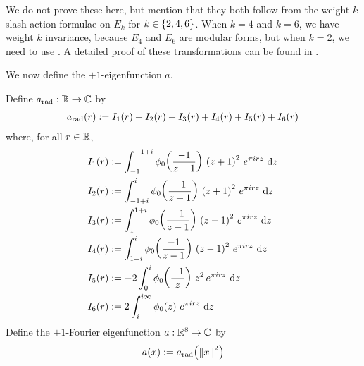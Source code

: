 We do not prove these here, but mention that they both follow from the weight $k$ slash action formulae on $E_k$ for $k \in \left\{ 2, 4, 6 \right\}$. When $k = 4$ and $k = 6$, we have weight $k$ invariance, because $E_4$ and $E_6$ are modular forms, but when $k = 2$, we need to use . A detailed proof of these transformations can be found in \cite{blueprint}.

We now define the $+1$-eigenfunction $a$.

\begin{boxdefinition}\label{Ch4:Def:a}
    Define $a_{\operatorname{rad}} : \mathbb{R} \to \mathbb{C}$ by
    \begin{align}
        a_{\operatorname{rad}}\!\left( r \right) := I_1(r) + I_2(r) + I_3(r) + I_4(r) + I_5(r) + I_6(r)
            \label{Ch4:Eq:a_rad_def}
    \end{align}
    where, for all $r \in \mathbb{R}$,
    \begin{align}
        I_1(r) &:= \int_{-1}^{-1 + i} \phi_0\of{\frac{-1}{z+1}} \,
                                 \parenth{z + 1}^2 \,
                                 e^{\pi i r z} \,
                                 \diff{z}
            \label{Ch4:Eq:I_1_def} \\
        I_2(r) &:= \int_{-1 + i}^{i} \phi_0\of{\frac{-1}{z+1}} \,
                                 \parenth{z + 1}^2 \,
                                 e^{\pi i r z} \,
                                 \diff{z}
            \label{Ch4:Eq:I_2_def} \\
        I_3(r) &:= \int_{1}^{1 + i} \phi_0\of{\frac{-1}{z - 1}} \,
                                \parenth{z - 1}^2 \,
                                e^{\pi i r z} \,
                                \diff{z}
            \label{Ch4:Eq:I_3_def} \\
        I_4(r) &:= \int_{1 + i}^{i} \phi_0\of{\frac{-1}{z - 1}} \,
                                \parenth{z - 1}^2 \,
                                e^{\pi i r z} \,
                                \diff{z}
            \label{Ch4:Eq:I_4_def} \\
        I_5(r) &:= -2 \int_{0}^{i} \phi_0\of{\frac{-1}{z}} \,
                                z^2 \,
                                e^{\pi i r z} \,
                                \diff{z}
            \label{Ch4:Eq:I_5_def} \\
        I_6(r) &:= 2 \int_{i}^{i \infty} \phi_0\of{z} \,
                                e^{\pi i r z} \,
                                \diff{z}
            \label{Ch4:Eq:I_6_def}
    \end{align}
    Define the $+1$-Fourier eigenfunction $a : \mathbb{R}^8 \to \mathbb{C}$ by
    \begin{align}
        a(x) := a_{\operatorname{rad}}\!\left( \left\lVert x \right\rVert^2 \right)
            \label{Ch4:Eq:a_def}
    \end{align}
\end{boxdefinition}

